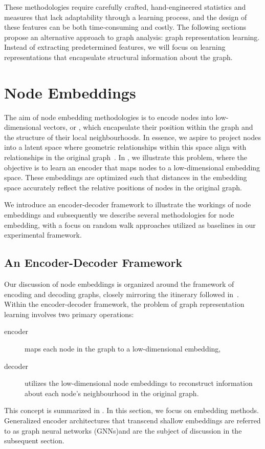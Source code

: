 These methodologies require carefully crafted, hand-engineered statistics and measures that lack adaptability through a learning process, and the design of these features can be both time-consuming and costly. The following sections propose an alternative approach to graph analysis: graph representation learning. Instead of extracting predetermined features, we will focus on learning representations that encapsulate structural information about the graph.

\section{Node Embeddings}\label{sec:shallowEmbeddings}
The aim of node embedding methodologies is to encode nodes into low-dimensional vectors, or , which encapsulate their position within the graph and the structure of their local neighbourhoods. In essence, we aspire to project nodes into a latent space where geometric relationships within this space align with relationships in the original graph~\cite{Hoff2002latentSpaceApproachesSocialNetworkAnalysis}. In , we illustrate this problem, where the objective is to learn an encoder that maps nodes to a low-dimensional embedding space. These embeddings are optimized such that distances in the embedding space accurately reflect the relative positions of nodes in the original graph.


We introduce an encoder-decoder framework to illustrate the workings of node embeddings and subsequently we describe several methodologies for node embedding, with a focus on random walk approaches utilized as baselines in our experimental framework.

\subsection{An Encoder-Decoder Framework}
Our discussion of node embeddings is organized around the framework of encoding and decoding graphs, closely mirroring the itinerary followed in~\cite{Hamilton2020GraphRL}. Within the encoder-decoder framework, the problem of graph representation learning involves two primary operations:
\begin{description}
    \item[encoder] maps each node in the graph to a low-dimensional embedding,
    \item[decoder] utilizes the low-dimensional node embeddings to reconstruct information about each node's neighbourhood in the original graph.
\end{description}
This concept is summarized in . In this section, we focus on  embedding methods. Generalized encoder architectures that transcend shallow embeddings are referred to as graph neural networks (GNNs)and are the subject of discussion in the subsequent section.

